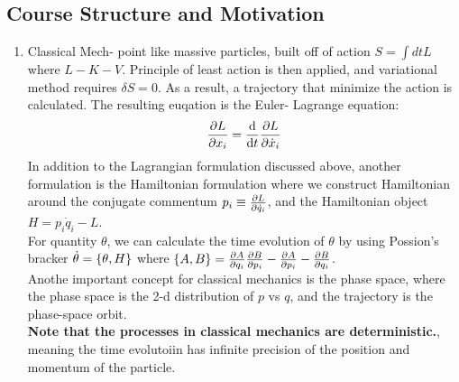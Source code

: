 \documentclass{article}
\begin{document}
\subsection*{Course Structure and Motivation}
\begin{enumerate}
 \item Classical Mech- point like massive particles, built off of action $S = \int dt L $ where $L - K -V$. Principle of least action is then applied, and variational method requires $\delta S = 0$. As a result, a trajectory that minimize the action is calculated. The resulting euqation is the Euler- Lagrange equation:
\begin{equation*}
  \pdv{L}{x_i} = \dv{t} \pdv{L}{\dot{x}_i}
\end{equation*}
In addition to the Lagrangian formulation discussed above, another formulation is the Hamiltonian formulation where we construct Hamiltonian around the conjugate commentum $p_i \equiv \pdv{L}{\dot{q}_i}$, and the Hamiltonian object $H = p_i\dot{q}_i -L$.  \\ 
For quantity $\theta$, we can calculate the time evolution of $\theta $ by using Possion's bracker $\dot{\theta}= \qty{\theta ,H}$ where $\qty{A,B}= \pdv{A}{q_i}\pdv{B}{p_i}- \pdv{A}{p_i}- \pdv{B}{q_i}$. \\ 
Anothe important concept for classical mechanics is the phase space, where the phase space is the 2-d distribution of $p $ vs $q$, and the trajectory is the phase-space orbit. \\ 
\textbf{Note that the processes in classical mechanics are deterministic.}, meaning the time evolutoiin has infinite precision of the position and momentum of the particle.


\end{enumerate}
\end{document}
